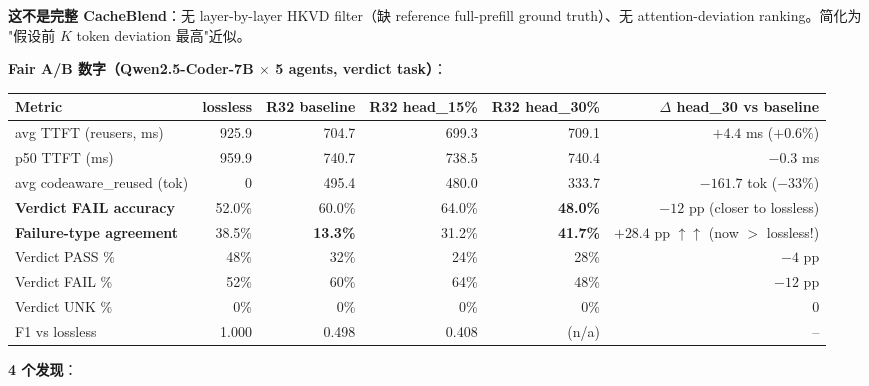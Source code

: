 \documentclass[11pt,a4paper]{article}
\begin{document}
\textbf{这不是完整 CacheBlend}：无 layer-by-layer HKVD filter（缺 reference
full-prefill ground truth）、无 attention-deviation ranking。简化为
"假设前 $K$ token deviation 最高"近似。

\textbf{Fair A/B 数字（Qwen2.5-Coder-7B $\times$ 5 agents, verdict task）}：
\begin{tabular}{@{}lrrrrr@{}}
\toprule
\textbf{Metric} & \textbf{lossless} & \textbf{R32 baseline} & \textbf{R32 head\_15\%} & \textbf{R32 head\_30\%} & $\Delta$ head\_30 vs baseline \\
\midrule
avg TTFT (reusers, ms)     & 925.9 & 704.7 & 699.3 & 709.1 & $+4.4$ ms ($+0.6$\%) \\
p50 TTFT (ms)              & 959.9 & 740.7 & 738.5 & 740.4 & $-0.3$ ms \\
avg codeaware\_reused (tok) & 0 & 495.4 & 480.0 & 333.7 & $-161.7$ tok ($-33$\%) \\
\textbf{Verdict FAIL accuracy}  & 52.0\% & 60.0\% & 64.0\% & \textbf{48.0\%} & $-12$ pp (closer to lossless) \\
\textbf{Failure-type agreement} & 38.5\% & \textbf{13.3\%} & 31.2\% & \textbf{41.7\%} & $\mathbf{+28.4}$ pp $\uparrow\uparrow$ (now $>$ lossless!) \\
Verdict PASS \%             & 48\% & 32\% & 24\% & 28\% & $-4$ pp \\
Verdict FAIL \%             & 52\% & 60\% & 64\% & 48\% & $-12$ pp \\
Verdict UNK \%              & 0\% & 0\% & 0\% & 0\% & 0 \\
F1 vs lossless             & 1.000 & 0.498 & 0.408 & (n/a) & -- \\
\bottomrule
\end{tabular}

\textbf{4 个发现}：
\end{document}
